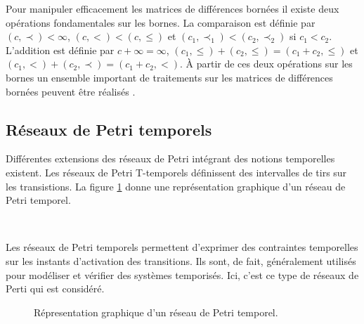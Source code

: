          Pour manipuler efficacement les matrices de différences bornées il
          existe deux opérations fondamentales sur les bornes. La comparaison
          est définie par $(c, \prec) < \infty$, $(c, <) < (c, \leq)$ et $(c_1,
          \prec_1) < (c_2, \prec_2)$ si $c_1 < c_2$. L'addition est définie par
          $c + \infty = \infty$, $(c_1, \leq) + (c_2, \leq) = (c_1 + c_2, \leq)$
          et $(c_1, <) + (c_2, \prec) = (c_1 + c_2, <)$. À partir de ces deux
          opérations sur les bornes un ensemble important de traitements sur les
          matrices de différences bornées peuvent être réalisés
          \cite{bengtsson02}.
          
    \subsection{Réseaux de Petri temporels}


      Différentes extensions des réseaux de Petri intégrant des notions
      temporelles existent. Les réseaux de Petri T-temporels \cite{merlin74}
      définissent des intervalles de tirs sur les transistions. La figure
      \ref{fig:petri-temporel} donne une représentation graphique d'un réseau
      de Petri temporel.
      
      ~

      Les réseaux de Petri temporels permettent d'exprimer des contraintes
      temporelles sur les instants d'activation des transitions. Ils sont, de
      fait, généralement utilisés pour modéliser et vérifier des systèmes
      temporisés. Ici, c'est ce type de réseaux de Perti qui est considéré.
      
      \begin{figure}[!ht]
        \centering \small
        \caption{Répresentation graphique d'un réseau de Petri temporel.}
        \label{fig:petri-temporel}
      \end{figure}
      
